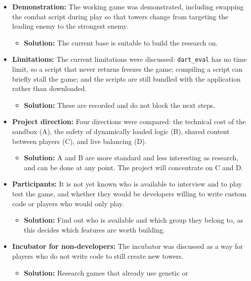 \documentclass[12pt,a4paper]{article}
\begin{document}
\begin{itemize}[leftmargin=*]
    \item \textbf{Demonstration:} The working game was demonstrated, including
    swapping the combat script during play so that towers change from
    targeting the leading enemy to the strongest enemy.
    \begin{itemize}
        \item \textbf{Solution:} The current base is suitable to build the
        research on.
    \end{itemize}
    \item \textbf{Limitations:} The current limitations were discussed:
    \texttt{dart\_eval} has no time limit, so a script that never returns
    freezes the game; compiling a script can briefly stall the game; and the
    scripts are still bundled with the application rather than downloaded.
    \begin{itemize}
        \item \textbf{Solution:} These are recorded and do not block the next
        steps.
    \end{itemize}
    \item \textbf{Project direction:} Four directions were compared: the
    technical cost of the sandbox (A), the safety of dynamically loaded logic
    (B), shared content between players (C), and live balancing (D).
    \begin{itemize}
        \item \textbf{Solution:} A and B are more standard and less
        interesting as research, and can be done at any point. The project
        will concentrate on C and D.
    \end{itemize}
    \item \textbf{Participants:} It is not yet known who is available to
    interview and to play test the game, and whether they would be developers
    willing to write custom code or players who would only play.
    \begin{itemize}
        \item \textbf{Solution:} Find out who is available and which group
        they belong to, as this decides which features are worth building.
    \end{itemize}
    \item \textbf{Incubator for non-developers:} The incubator was discussed as
    a way for players who do not write code to still create new towers.
    \begin{itemize}
        \item \textbf{Solution:} Research games that already use genetic or

\end{itemize}
\end{itemize}
\end{document}
